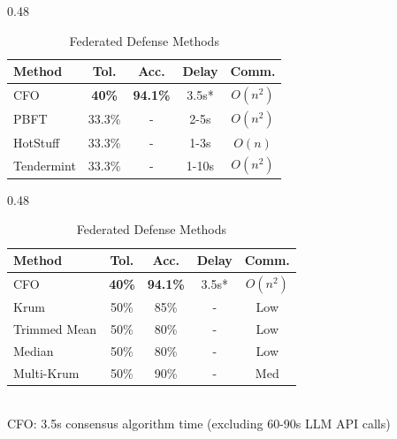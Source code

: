 \documentclass{article}
\begin{document}
\begin{table}[htbp]
\centering
\caption{Detailed Comparison with Existing Methods}
\label{tab:comparison}
\begin{subtable}{0.48\textwidth}
\centering
\caption{BFT Consensus Methods}
\begin{tabular}{|l|c|c|c|c|}
\toprule
Method & Tol. & Acc. & Delay & Comm. \\
\midrule
CFO & \textbf{40\%} & \textbf{94.1\%} & 3.5s* & $O(n^2)$ \\
PBFT & 33.3\% & - & 2-5s & $O(n^2)$ \\
HotStuff & 33.3\% & - & 1-3s & $O(n)$ \\
Tendermint & 33.3\% & - & 1-10s & $O(n^2)$ \\
\bottomrule
\end{tabular}
\end{subtable}
\hfill
\begin{subtable}{0.48\textwidth}
\caption{Federated Defense Methods}
\begin{tabular}{|l|c|c|c|c|}
\toprule
Method & Tol. & Acc. & Delay & Comm. \\
\midrule
CFO & \textbf{40\%} & \textbf{94.1\%} & 3.5s* & $O(n^2)$ \\
Krum & 50\% & 85\% & - & Low \\
Trimmed Mean & 50\% & 80\% & - & Low \\
Median & 50\% & 80\% & - & Low \\
Multi-Krum & 50\% & 90\% & - & Med \\
\bottomrule
\end{tabular}
\end{subtable}
\\
{\fontsize{8}{9}\selectfont *CFO: 3.5s consensus algorithm time (excluding 60-90s LLM API calls)}
\end{table}
\end{document}
